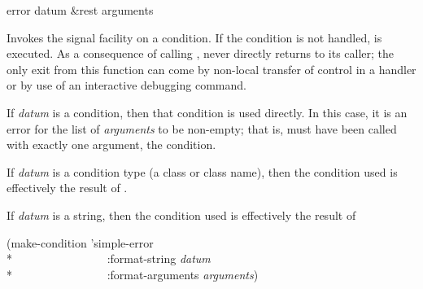 \begin{defun}[Function]
error datum &rest arguments

Invokes the signal facility on a condition. If the condition is not handled,
 is executed. As a consequence of calling 
,  never directly returns to its caller; the only exit from this
function can come by non-local transfer of control in a handler or by use of
an interactive debugging command.
  
If \emph{datum} is a condition, then that condition is used directly. 
In this case, it is an error for the list of \emph{arguments} to be non-empty;
that is,  must have been called with exactly one argument, the condition.

If \emph{datum} is a condition type (a class or class name), then the condition used is effectively the result
of .

If \emph{datum} is a string, then the condition used is effectively the result of
\begin{lisp}
(make-condition 'simple-error \\*
~~~~~~~~~~~~~~~~:format-string \emph{datum} \\*
~~~~~~~~~~~~~~~~:format-arguments \emph{arguments})
\end{lisp}
\end{defun}

